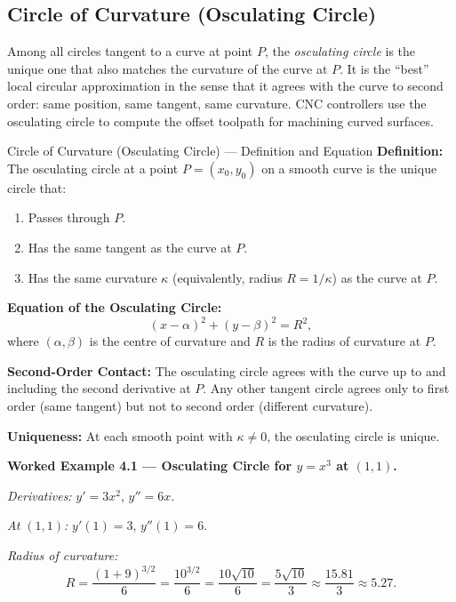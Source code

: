 \documentclass[12pt,a4paper]{article}
\begin{document}
\subsection{Circle of Curvature (Osculating Circle)}

Among all circles tangent to a curve at point $P$, the \emph{osculating circle} is the unique one that also matches the curvature of the curve at $P$. It is the ``best'' local circular approximation in the sense that it agrees with the curve to second order: same position, same tangent, same curvature. CNC controllers use the osculating circle to compute the offset toolpath for machining curved surfaces.

\begin{infobox}{Circle of Curvature (Osculating Circle) --- Definition and Equation}
\textbf{Definition:} The osculating circle at a point $P = (x_0, y_0)$ on a smooth curve is the unique circle that:
\begin{enumerate}[nosep]
  \item Passes through $P$.
  \item Has the same tangent as the curve at $P$.
  \item Has the same curvature $\kappa$ (equivalently, radius $R = 1/\kappa$) as the curve at $P$.
\end{enumerate}

\textbf{Equation of the Osculating Circle:}
\[
  (x - \alpha)^{2} + (y - \beta)^{2} = R^{2},
\]
where $(\alpha, \beta)$ is the centre of curvature and $R$ is the radius of curvature at $P$.

\textbf{Second-Order Contact:} The osculating circle agrees with the curve up to and including the second derivative at $P$. Any other tangent circle agrees only to first order (same tangent) but not to second order (different curvature).

\textbf{Uniqueness:} At each smooth point with $\kappa \neq 0$, the osculating circle is unique.
\end{infobox}

\textbf{Worked Example 4.1 --- Osculating Circle for $y = x^3$ at $(1, 1)$.}

\textit{Derivatives:} $y' = 3x^{2}$, $y'' = 6x$.

\textit{At $(1,1)$:} $y'(1) = 3$, $y''(1) = 6$.

\textit{Radius of curvature:}
\[
  R = \frac{(1+9)^{3/2}}{6} = \frac{10^{3/2}}{6} = \frac{10\sqrt{10}}{6} = \frac{5\sqrt{10}}{3} \approx \frac{15.81}{3} \approx 5.27.
\]
\end{document}
